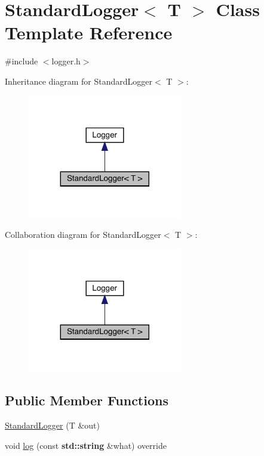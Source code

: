 \hypertarget{class_standard_logger}{}\section{Standard\+Logger$<$ T $>$ Class Template Reference}
\label{class_standard_logger}


{\ttfamily \#include $<$logger.\+h$>$}



Inheritance diagram for Standard\+Logger$<$ T $>$\+:\nopagebreak
\begin{figure}[H]
\begin{center}
\leavevmode
\includegraphics[width=191pt]{class_standard_logger__inherit__graph}
\end{center}
\end{figure}


Collaboration diagram for Standard\+Logger$<$ T $>$\+:\nopagebreak
\begin{figure}[H]
\begin{center}
\leavevmode
\includegraphics[width=191pt]{class_standard_logger__coll__graph}
\end{center}
\end{figure}
\subsection*{Public Member Functions}
\begin{DoxyCompactItemize}
\item 
\hyperlink{class_standard_logger_a2c81129e394334f40058d0fc38d427ab}{Standard\+Logger} (T \&out)
\item 
void \hyperlink{class_standard_logger_af09ac6658b0c4826d1b3bd3292736184}{log} (const \textbf{ std\+::string} \&what) override
\end{DoxyCompactItemize}


